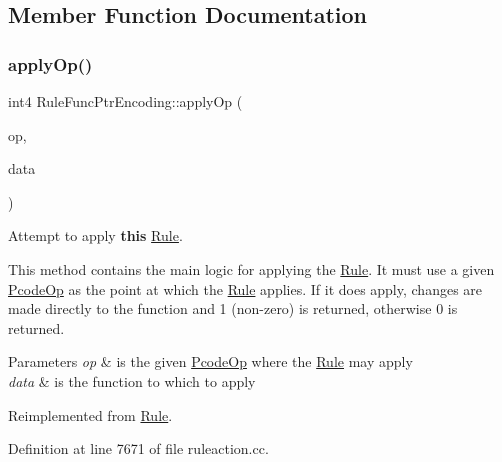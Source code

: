 \subsection{Member Function Documentation}
\mbox{\label{class_rule_func_ptr_encoding_ab4cf320ff9f365e41dde30a21dc7a277}} 
\subsubsection{\texorpdfstring{applyOp()}{applyOp()}}
{\footnotesize\ttfamily int4 Rule\+Func\+Ptr\+Encoding\+::apply\+Op (\begin{DoxyParamCaption}\item[{\mbox{\hyperlink{class_pcode_op}{Pcode\+Op}} $\ast$}]{op,  }\item[{\mbox{\hyperlink{class_funcdata}{Funcdata}} \&}]{data }\end{DoxyParamCaption})\hspace{0.3cm}{\ttfamily [virtual]}}



Attempt to apply {\bfseries{this}} \mbox{\hyperlink{class_rule}{Rule}}. 

This method contains the main logic for applying the \mbox{\hyperlink{class_rule}{Rule}}. It must use a given \mbox{\hyperlink{class_pcode_op}{Pcode\+Op}} as the point at which the \mbox{\hyperlink{class_rule}{Rule}} applies. If it does apply, changes are made directly to the function and 1 (non-\/zero) is returned, otherwise 0 is returned. 
\begin{DoxyParams}{Parameters}
{\em op} & is the given \mbox{\hyperlink{class_pcode_op}{Pcode\+Op}} where the \mbox{\hyperlink{class_rule}{Rule}} may apply \\
\hline
{\em data} & is the function to which to apply \\
\hline
\end{DoxyParams}


Reimplemented from \mbox{\hyperlink{class_rule_a4e3e61f066670175009f60fb9dc60848}{Rule}}.



Definition at line 7671 of file ruleaction.\+cc.

